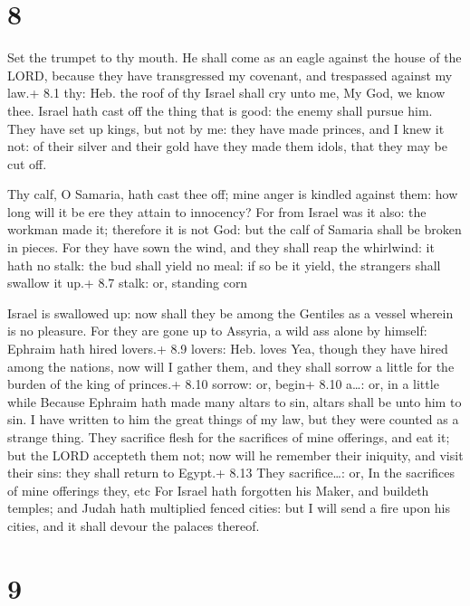 \hypertarget{section-7}{%
\section{8}\label{section-7}}

 Set the trumpet to thy mouth. He shall come as an eagle
against the house of the LORD, because they have transgressed my
covenant, and trespassed against my law.+ 8.1 thy: Heb. the roof of thy
 Israel shall cry unto me, My God, we know thee.
 Israel hath cast off the thing that is good: the enemy
shall pursue him.  They have set up kings, but not by me:
they have made princes, and I knew it not: of their silver and their
gold have they made them idols, that they may be cut off.

 Thy calf, O Samaria, hath cast thee off; mine anger is
kindled against them: how long will it be ere they attain to innocency?
 For from Israel was it also: the workman made it; therefore
it is not God: but the calf of Samaria shall be broken in pieces.
 For they have sown the wind, and they shall reap the
whirlwind: it hath no stalk: the bud shall yield no meal: if so be it
yield, the strangers shall swallow it up.+ 8.7 stalk: or, standing corn

 Israel is swallowed up: now shall they be among the
Gentiles as a vessel wherein is no pleasure.  For they are
gone up to Assyria, a wild ass alone by himself: Ephraim hath hired
lovers.+ 8.9 lovers: Heb. loves  Yea, though they have
hired among the nations, now will I gather them, and they shall sorrow a
little for the burden of the king of princes.+ 8.10 sorrow: or, begin+
8.10 a\ldots: or, in a little while  Because Ephraim hath
made many altars to sin, altars shall be unto him to sin. 
I have written to him the great things of my law, but they were counted
as a strange thing.  They sacrifice flesh for the
sacrifices of mine offerings, and eat it; but the LORD accepteth them
not; now will he remember their iniquity, and visit their sins: they
shall return to Egypt.+ 8.13 They sacrifice\ldots: or, In the sacrifices
of mine offerings they, etc  For Israel hath forgotten his
Maker, and buildeth temples; and Judah hath multiplied fenced cities:
but I will send a fire upon his cities, and it shall devour the palaces
thereof.

\hypertarget{section-8}{%
\section{9}\label{section-8}}

